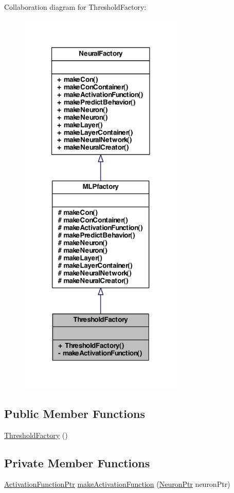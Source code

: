 Collaboration diagram for ThresholdFactory:
\nopagebreak
\begin{figure}[H]
\begin{center}
\leavevmode
\includegraphics[width=222pt]{class_threshold_factory__coll__graph}
\end{center}
\end{figure}
\subsection*{Public Member Functions}
\begin{DoxyCompactItemize}
\item 
\hyperlink{class_threshold_factory_a7bf7c828eb1d238a22993fed8e617f72}{ThresholdFactory} ()
\end{DoxyCompactItemize}
\subsection*{Private Member Functions}
\begin{DoxyCompactItemize}
\item 
\hyperlink{_a_m_o_r_e_8h_a77602a0277a02e5769c3df0adc669b17}{ActivationFunctionPtr} \hyperlink{class_threshold_factory_a6be00aaf355c02f73e1f818d3de8c548}{makeActivationFunction} (\hyperlink{_a_m_o_r_e_8h_ac1ea936c2c7728eb382278131652fef4}{NeuronPtr} neuronPtr)
\end{DoxyCompactItemize}


